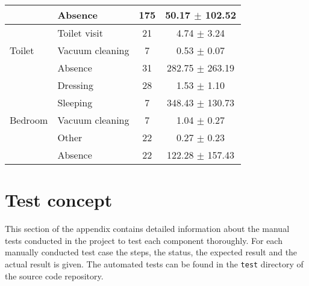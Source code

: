 \begin{table}[H]
\begin{tabular}{l|l|c|c}
        & Absence & 175 & 50.17 $\pm$ 102.52 \\
        \midrule[1pt]
        \multirow{3}{*}{Toilet} & Toilet visit & 21 & 4.74 $\pm$ 3.24 \\
        \cline{2-4}
        & Vacuum cleaning & 7 & 0.53 $\pm$ 0.07 \\
        \cline{2-4}
        & Absence & 31 & 282.75 $\pm$ 263.19 \\
        \midrule[1pt]
        \multirow{5}{*}{Bedroom} & Dressing & 28 & 1.53 $\pm$ 1.10 \\
        \cline{2-4}
        & Sleeping & 7 & 348.43 $\pm$ 130.73 \\
        \cline{2-4}
        & Vacuum cleaning & 7 & 1.04 $\pm$ 0.27 \\
        \cline{2-4}
        & Other & 22 & 0.27 $\pm$ 0.23 \\
        \cline{2-4}
        & Absence & 22 & 122.28 $\pm$ 157.43 \\
        \bottomrule
    \end{tabular}
\end{table}

\clearpage
\landscapevalues

\section{Test concept}
\label{app:Test-Concept}
This section of the appendix contains detailed information about the manual tests conducted in the project to test each component thoroughly. For each manually conducted test case the steps, the status, the expected result and the actual result is given. The automated tests can be found in the \texttt{test} directory of the source code repository.

